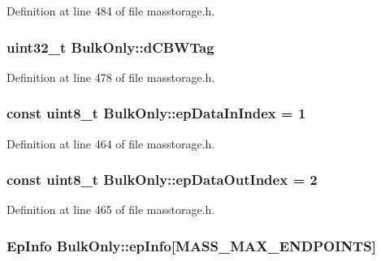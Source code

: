 \-Definition at line 484 of file masstorage.\-h.

\hypertarget{class_bulk_only_a7ae682d50badd1386a06f30f35a32d1d}{
\subsubsection[{d\-C\-B\-W\-Tag}]{\setlength{\rightskip}{0pt plus 5cm}uint32\-\_\-t {\bf \-Bulk\-Only\-::d\-C\-B\-W\-Tag}}}\label{class_bulk_only_a7ae682d50badd1386a06f30f35a32d1d}


\-Definition at line 478 of file masstorage.\-h.

\hypertarget{class_bulk_only_a9e487226408578a2971570bcf7de62fe}{
\subsubsection[{ep\-Data\-In\-Index}]{\setlength{\rightskip}{0pt plus 5cm}const uint8\-\_\-t {\bf \-Bulk\-Only\-::ep\-Data\-In\-Index} = 1}}\label{class_bulk_only_a9e487226408578a2971570bcf7de62fe}


\-Definition at line 464 of file masstorage.\-h.

\hypertarget{class_bulk_only_a8d527bdc285870f3571481a4fd982721}{
\subsubsection[{ep\-Data\-Out\-Index}]{\setlength{\rightskip}{0pt plus 5cm}const uint8\-\_\-t {\bf \-Bulk\-Only\-::ep\-Data\-Out\-Index} = 2}}\label{class_bulk_only_a8d527bdc285870f3571481a4fd982721}


\-Definition at line 465 of file masstorage.\-h.

\hypertarget{class_bulk_only_aee2247fd0a251e4da36e8c09bbe6917f}{
\subsubsection[{ep\-Info}]{\setlength{\rightskip}{0pt plus 5cm}\-Ep\-Info {\bf \-Bulk\-Only\-::ep\-Info}\mbox{[}{\bf \-M\-A\-S\-S\-\_\-\-M\-A\-X\-\_\-\-E\-N\-D\-P\-O\-I\-N\-T\-S}\mbox{]}}}\label{class_bulk_only_aee2247fd0a251e4da36e8c09bbe6917f}


